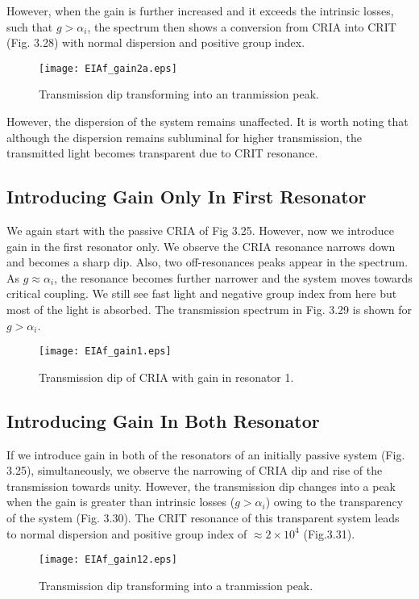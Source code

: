 However, when the gain is further increased and it exceeds the intrinsic losses, such that $g > \alpha_{i}$, the spectrum then shows a conversion from CRIA into CRIT (Fig. 3.28) with normal dispersion and positive group index.

\begin{figure}[h]
\centering
\texttt{[image: EIAf\_gain2a.eps]}
\caption{Transmission dip transforming into an tranmission peak.}
\end{figure}

However, the dispersion of the system remains unaffected. It is worth noting that although the dispersion remains subluminal for higher transmission, the transmitted light becomes transparent due to CRIT resonance.

\subsection{Introducing Gain Only In First Resonator}
We again start with the passive CRIA of Fig 3.25. However, now we introduce gain in the first resonator only. We observe the CRIA resonance narrows down and becomes a sharp dip. Also, two off-resonances peaks appear in the spectrum. As $g \approx \alpha_{i}$, the resonance becomes further narrower and the system moves towards critical coupling. We still see fast light and negative group index from here but most of the light is absorbed. The transmission spectrum in Fig. 3.29 is shown for $g > \alpha_{i}$.

\begin{figure}[h]
\centering
\texttt{[image: EIAf\_gain1.eps]}
\caption{Transmission dip of CRIA with gain in resonator 1.}
\end{figure}

\subsection{Introducing Gain In Both Resonator}
If we introduce gain in both of the resonators of an initially passive system (Fig. 3.25), simultaneously, we observe the narrowing of CRIA dip and rise of the transmission towards unity. However, the transmission dip changes into a peak when the gain is greater than intrinsic losses ($g > \alpha_{i}$) owing to the transparency of the system (Fig. 3.30). The CRIT resonance of this transparent system leads to normal dispersion and positive group index of $\approx 2\times10^{4}$ (Fig.3.31).

\begin{figure}[h]
\centering
\texttt{[image: EIAf\_gain12.eps]}
\caption{Transmission dip transforming into a tranmission peak.}
\end{figure}

